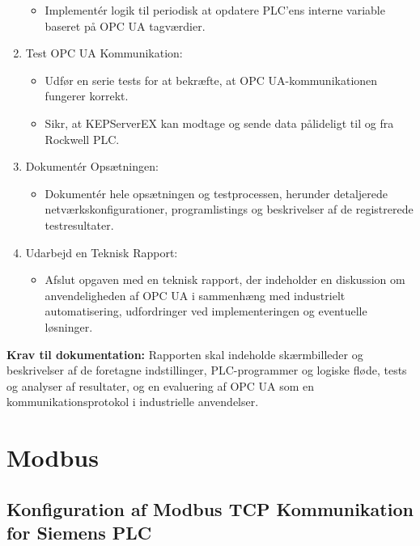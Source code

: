 \begin{enumerate}
\begin{itemize}
		\item Implementér logik til periodisk at opdatere PLC'ens interne variable baseret på OPC UA tagværdier.
	\end{itemize}
	\item Test OPC UA Kommunikation:
	\begin{itemize}
		\item Udfør en serie tests for at bekræfte, at OPC UA-kommunikationen fungerer korrekt.
		\item Sikr, at KEPServerEX kan modtage og sende data pålideligt til og fra Rockwell PLC.
	\end{itemize}
	\item Dokumentér Opsætningen:
	\begin{itemize}
		\item Dokumentér hele opsætningen og testprocessen, herunder detaljerede netværkskonfigurationer, programlistings og beskrivelser af de registrerede testresultater.
	\end{itemize}
	\item Udarbejd en Teknisk Rapport:
	\begin{itemize}
		\item Afslut opgaven med en teknisk rapport, der indeholder en diskussion om anvendeligheden af OPC UA i sammenhæng med industrielt automatisering, udfordringer ved implementeringen og eventuelle løsninger.
	\end{itemize}
\end{enumerate}
\textbf{Krav til dokumentation:} Rapporten skal indeholde skærmbilleder og beskrivelser af de foretagne indstillinger, PLC-programmer og logiske fløde, tests og analyser af resultater, og en evaluering af OPC UA som en kommunikationsprotokol i industrielle anvendelser.

\section{Modbus}
\subsection*{Konfiguration af Modbus TCP Kommunikation for Siemens PLC}
\label{subsec:modbus_tcp_comm_siemens}

